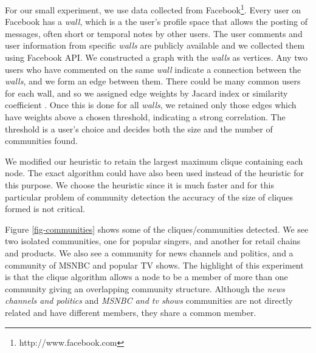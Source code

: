 For our small experiment, we use data collected from Facebook\footnote[1]{http://www.facebook.com}.
Every user on Facebook has a {\it wall}, which is a the user's profile space that allows the posting of messages, often short or temporal notes by other users. The user comments and user information from specific {\it walls} are publicly available and we collected them using Facebook API. We constructed a graph with the {\it walls} as vertices. Any two users who have commented on the same {\it wall} indicate a connection between the {\it walls}, and we form an edge between them. There could be many common users for each wall, and so we assigned edge weights by Jacard index or similarity coefficient \cite{Leydesdorff}. Once this is done for all {\it walls}, we retained only those edges which have weights above a chosen threshold, indicating a strong correlation. The threshold is a user's choice and decides both the size and the number of communities found.

We modified our heuristic to retain the largest maximum clique containing each node. 
The exact algorithm could have also been used instead of the heuristic for this purpose. We choose the heuristic since it is much faster and for this particular problem of community detection the accuracy of the size of cliques formed is not critical.

Figure \ref{fig-communities} shows some of the cliques/communities detected. We see two isolated communities, one for popular singers, and another for retail chains and products. We also see a community for news channels and politics, and a community of MSNBC and popular TV shows. The highlight of this experiment  is that the
clique algorithm allows a node to be a member of more than one community giving an overlapping community structure. Although the {\it news channels and politics} and {\it MSNBC and tv shows} communities are not directly related and have different members, they share a common member.

